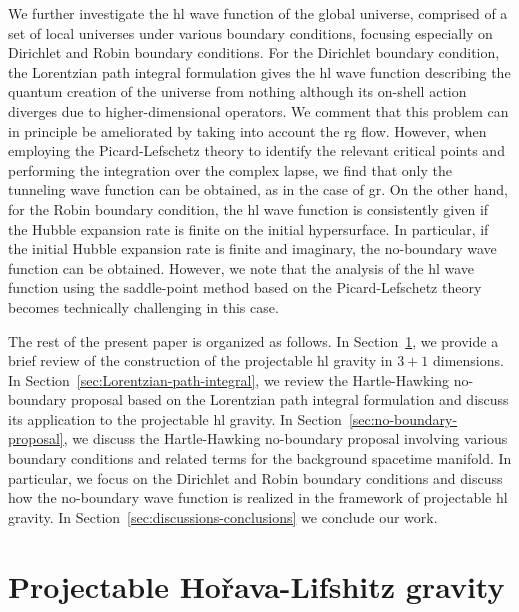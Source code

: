 \documentclass[superscriptaddress,aps,preprintnumbers,nofootinbib]{revtex4-2}
\begin{document}
We further investigate the \ac{hl} wave function of the global universe, comprised of a set of local universes under various boundary conditions, focusing especially on Dirichlet and Robin boundary conditions. For the Dirichlet boundary condition, the Lorentzian path integral formulation gives the \ac{hl} wave function describing the quantum creation of the universe from nothing although its on-shell action diverges due to higher-dimensional operators. We comment that this problem can in principle be ameliorated by taking into account the \ac{rg} flow. However, when employing the Picard-Lefschetz theory to identify the relevant critical points and performing the integration over the complex lapse, we find that only the tunneling wave function can be obtained, as in the case of \ac{gr}. On the other hand, for the Robin boundary condition, the \ac{hl} wave function is consistently given if the Hubble expansion rate is finite on the initial hypersurface. In particular, if the initial Hubble expansion rate is finite and imaginary, the no-boundary wave function can be obtained. However, we note that the analysis of the \ac{hl} wave function using the saddle-point method based on the Picard-Lefschetz theory becomes technically challenging in this case.


The rest of the present paper is organized as follows. In Section~\ref{sec:HL-graivty}, we provide a brief review of the construction of the projectable \ac{hl} gravity in $3 + 1$ dimensions. In Section~\ref{sec:Lorentzian-path-integral}, we review the Hartle-Hawking no-boundary proposal based on the Lorentzian path integral formulation and discuss its application to the projectable \ac{hl} gravity. In Section~\ref{sec:no-boundary-proposal}, we discuss the Hartle-Hawking no-boundary proposal involving various boundary conditions and related terms for the background spacetime manifold. In particular, we focus on the Dirichlet and Robin boundary conditions and discuss how the no-boundary wave function is realized in the framework of projectable \ac{hl} gravity. In Section~\ref{sec:discussions-conclusions} we conclude our work.




\section{Projectable Ho\v{r}ava-Lifshitz gravity}
\label{sec:HL-graivty}
\end{document}
